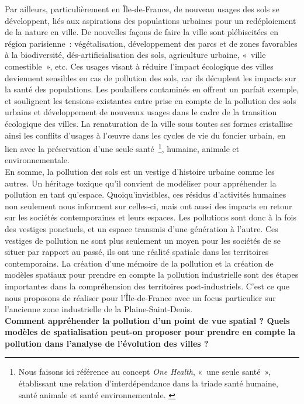 \documentclass[a4paper,twoside,12pt]{book}
\begin{document}
Par ailleurs, particulièrement en Île-de-France, de nouveau usages des sols se développent, liés aux aspirations des populations urbaines pour un redéploiement de la nature en ville. De nouvelles façons de faire la ville sont plébiscitées en région parisienne : végétalisation, développement des parcs et de zones favorables à la biodiversité, dés-artificialisation des sols, agriculture urbaine, « ville comestible », etc. Ces usages visant à réduire l’impact écologique des villes deviennent sensibles en cas de pollution des sols, car ils décuplent les impacts sur la santé des populations. Les poulaillers contaminés en offrent un parfait exemple, et soulignent les tensions existantes entre prise en compte de la pollution des sols urbains et développement de nouveaux usages dans le cadre de la transition écologique des villes. La renaturation de la ville sous toutes ses formes cristallise ainsi les conflits d’usages à l’œuvre dans les cycles de vie du foncier urbain, en lien avec la préservation \og{}d’une seule santé \footnote{Nous faisons ici référence au concept \textit{One Health}, « une seule santé », établissant une relation d’interdépendance dans la triade santé humaine, santé animale et santé environnementale. \cite{inrae_one_nodate}}\fg{}, humaine, animale et environnementale. \\

En somme, la pollution des sols est un vestige d’histoire urbaine comme les autres. Un héritage toxique qu'il convient de modéliser pour appréhender la pollution en tant qu'espace. Quoiqu’invisibles, ces résidus d’activités humaines non seulement nous informent sur celles-ci, mais ont aussi des impacts en retour sur les sociétés contemporaines et leurs espaces. Les pollutions sont donc à la fois des vestiges ponctuels, et un espace transmis d’une génération à l'autre. Ces vestiges de pollution ne sont plus seulement un moyen pour les sociétés de se situer par rapport au passé, ils ont une réalité spatiale dans les territoires contemporains. La création d’une mémoire de la pollution et la création de modèles spatiaux pour prendre en compte la pollution industrielle sont des étapes importantes dans la compréhension des territoires post-industriels. C'est ce que nous proposons de réaliser pour l'Île-de-France avec un focus particulier sur l'ancienne zone industrielle de la Plaine-Saint-Denis. \\

\textbf{Comment appréhender la pollution d’un point de vue spatial ? Quels modèles de spatialisation peut-on proposer pour prendre en compte la pollution dans l’analyse de l’évolution des villes ?} \\
\end{document}
